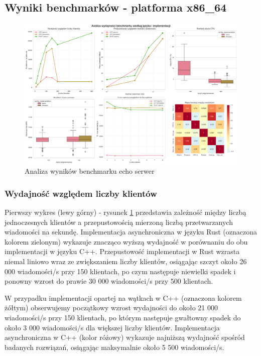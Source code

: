 \subsection{Wyniki benchmarków - platforma x86\_64}
\begin{figure}[H]
    \centering
    \includegraphics[width=\textwidth]{analiza/images/conc/echo/x86/analiza_benchmarku.png}
    \caption{Analiza wyników benchmarku echo serwer}
    \label{analiza_benchmarku_echo_serwer_x86_64}
\end{figure}

\subsubsection{Wydajność względem liczby klientów}
Pierwszy wykres (lewy górny) - rysunek \ref{analiza_benchmarku_echo_serwer_x86_64} przedstawia zależność między liczbą jednoczesnych klientów a przepustowością mierzoną liczbą przetwarzanych wiadomości na sekundę. Implementacja asynchroniczna w języku Rust (oznaczona kolorem zielonym) wykazuje znacząco wyższą wydajność w porównaniu do obu implementacji w języku C++. Przepustowość implementacji w Rust wzrasta niemal liniowo wraz ze zwiększaniem liczby klientów, osiągając szczyt około 26 000 wiadomości/s przy 150 klientach, po czym następuje niewielki spadek i ponowny wzrost do prawie 30 000 wiadomości/s przy 500 klientach.

W przypadku implementacji opartej na wątkach w C++ (oznaczona kolorem żółtym) obserwujemy początkowy wzrost wydajności do około 21 000 wiadomości/s przy 150 klientach, po którym następuje gwałtowny spadek do około 3 000 wiadomości/s dla większej liczby klientów. Implementacja asynchroniczna w C++ (kolor różowy) wykazuje najniższą wydajność spośród badanych rozwiązań, osiągając maksymalnie około 5 500 wiadomości/s.

